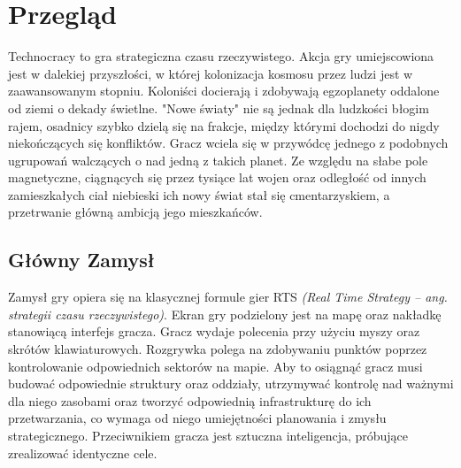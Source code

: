 \documentclass[a4paper]{scrreprt}
\title{\GameTiTle{}}
\subtitle{Dokument projektowy wersja 1}
\author{Laura Stasiulewicz}
\def \GameTiTle{Technocracy}
\begin{document}
\maketitle

\begin{abstract}
\GameTiTle{} to gra strategiczna czasu rzeczywistego. Celem gracza jest pokonanie komputerowego przeciwnika w walce o kontrolę nad punktem dominacji na mapie. Aby to uczynić, musi wykorzystać zdolność planowania, zarządzania zarówno jednostkami, jak i zasobami oraz wiedzy na temat dostępnych rodzajów oddziałów jakie może przywołać i interakcji między nimi.  %

\end{abstract}

{
  \hypersetup{linkcolor=black}
  \tableofcontents
}

\chapter{Przegląd}
\GameTiTle{} to gra strategiczna czasu rzeczywistego. Akcja gry umiejscowiona jest w dalekiej przyszłości, w której kolonizacja kosmosu przez ludzi jest w zaawansowanym stopniu. Koloniści docierają i zdobywają  egzoplanety oddalone od ziemi o dekady świetlne. "Nowe światy" nie są jednak dla ludzkości błogim rajem, osadnicy szybko dzielą się na frakcje, między którymi dochodzi do nigdy niekończących się konfliktów. Gracz wciela się w przywódcę jednego z podobnych ugrupowań walczących o nad jedną z takich planet. Ze względu na słabe pole magnetyczne, ciągnących się przez tysiące lat wojen oraz odległość od innych zamieszkałych ciał niebieski ich nowy świat stał się cmentarzyskiem, a przetrwanie główną ambicją jego mieszkańców.
\section{Główny Zamysł}
Zamysł gry opiera się na klasycznej formule gier RTS \emph{(Real Time Strategy -- ang. strategii czasu rzeczywistego)}. Ekran gry podzielony jest na mapę oraz nakładkę stanowiącą interfejs gracza. Gracz wydaje polecenia przy użyciu myszy oraz skrótów klawiaturowych. Rozgrywka polega na zdobywaniu punktów poprzez kontrolowanie odpowiednich sektorów na mapie. Aby to osiągnąć gracz musi budować odpowiednie struktury oraz oddziały, utrzymywać kontrolę nad ważnymi dla niego zasobami oraz tworzyć odpowiednią infrastrukturę do ich przetwarzania, co wymaga od niego umiejętności planowania i zmysłu strategicznego. Przeciwnikiem gracza jest sztuczna inteligencja, próbujące zrealizować identyczne cele.
\end{document}
